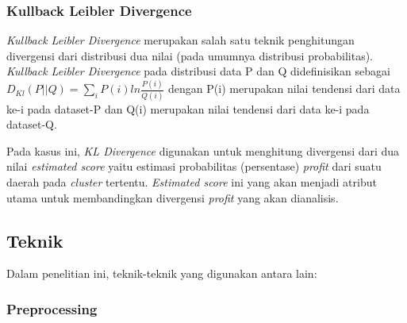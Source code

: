 \documentclass{article}
\begin{document}
\subsubsection{Kullback Leibler Divergence}
\begin{adjustwidth}{4em}{0pt}
\hspace{\parindent}\textit{Kullback Leibler Divergence} merupakan salah satu teknik penghitungan divergensi dari distribusi dua nilai (pada umumnya distribusi probabilitas). \textit{Kullback Leibler Divergence} pada distribusi data  P dan Q  didefinisikan sebagai 
$D_{Kl}(P||Q) = \sum\limits_{i}P(i)ln\frac{P(i)}{Q(i)}$
dengan P(i) merupakan nilai tendensi dari data ke-i pada dataset-P dan Q(i) merupakan nilai tendensi dari data ke-i pada dataset-Q.

Pada kasus ini, \textit{KL Divergence} digunakan untuk menghitung divergensi dari dua nilai \textit{estimated score} yaitu estimasi probabilitas (persentase) \textit{profit} dari suatu daerah pada \textit{cluster} tertentu. \textit{Estimated score} ini  yang akan menjadi atribut utama untuk membandingkan divergensi \textit{profit} yang akan dianalisis.

\end{adjustwidth}

\subsection{Teknik}

\begin{adjustwidth}{2em}{0pt}

\hspace{\parindent}Dalam penelitian ini, teknik-teknik yang digunakan antara lain:

\end{adjustwidth}

\subsubsection{Preprocessing}
\end{document}
